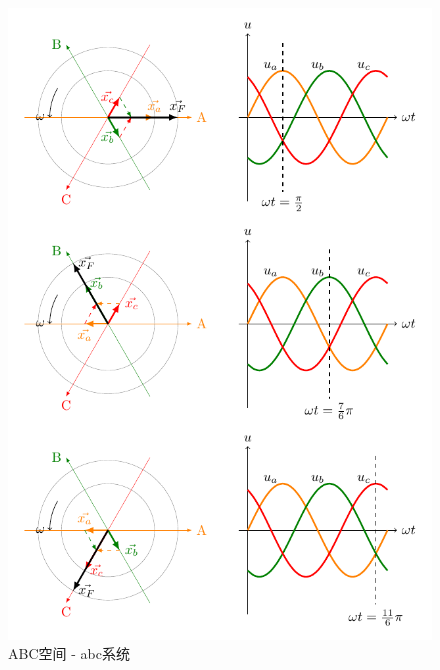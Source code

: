 \documentclass{ctexart}
\numberwithin{equation}{section}
\begin{document}
\begin{figure}[htb]
\centering
\begin{minipage}[b]{0.48\linewidth}
\centering
\includegraphics[width = \linewidth]{ABC-vector-space.pdf}
\caption{ABC空间 - abc系统}
\label{abc-space}
\end{minipage}
\hspace{10pt}
\begin{minipage}[b]{0.48\linewidth}
\centering

\end{minipage}
\end{figure}
\end{document}
